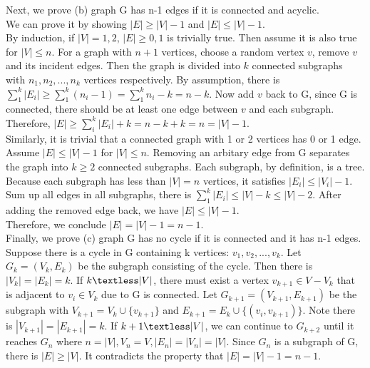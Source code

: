 \documentclass[titlepage, paper=a4, fontsize=11pt]{scrartcl} %
\numberwithin{equation}{section} %
\numberwithin{figure}{section} %
\numberwithin{table}{section} %
\numberwithin{figure}{section}
\begin{document}
Next, we prove (b) graph G has n-1 edges if it is connected and acyclic. \\
We can prove it by showing $|E| \geq |V| -1$ and $|E| \leq |V| -1$. \\
By induction, if $|V|=1,2$, $|E| \geq 0,1$ is trivially true. Then assume it is also true for $|V| \leq n$. For a graph with $n+1$ vertices, choose a random vertex $v$, remove $v$ and its incident edges. Then the graph is divided into $k$ connected subgraphs with $n_1, n_2, ... , n_k$ vertices respectively. By assumption, there is $\sum_1^k |E_i| \geq \sum_1^k (n_i -1)=\sum_1^k n_i - k = n-k$. Now add $v$ back to G, since G is connected, there should be at least one edge between $v$ and each subgraph. Therefore,
$|E| \geq \sum_i^k |E_i| + k = n-k+k = n = |V| - 1$. \\
Similarly, it is trivial that a connected graph with 1 or 2 vertices has 0 or 1 edge. Assume $|E| \leq |V| -1$ for $|V| \leq n$. Removing an arbitary edge from G separates the graph into $k \geq 2$ connected subgraphs. Each subgraph, by definition, is a tree. Because each subgraph has less than $|V|=n$ vertices, it satisfies $|E_i| \leq |V_i| - 1$. Sum up all edges in all subgraphs, there is $\sum_1^k |E_i| \leq |V| - k \leq |V| - 2$. After adding the removed edge back, we have $|E| \leq |V| - 1$. \\
Therefore, we conclude $|E| = |V| - 1 = n-1$. \\

Finally, we prove (c) graph G has no cycle if it is connected and it has n-1 edges. \\
Suppose there is a cycle in G containing k vertices: $v_1, v_2, ... , v_k$. Let $G_k = (V_k, E_k)$ be the subgraph consisting of the cycle. Then there is $|V_k| = |E_k| = k$. If $k \textless |V|$, there must exist a vertex $v_{k+1} \in V - V_k$ that is adjacent to $v_i \in V_k$ due to G is connected. Let $G_{k+1} = (V_{k+1}, E_{k+1})$ be the subgraph with $V_{k+1} = V_k \cup \{v_{k+1}\}$ and $E_{k+1} = E_k \cup \{(v_i, v_{k+1})\}$. Note there is $|V_{k+1}| = |E_{k+1}| = k$. If $k+1 \textless |V|$, we can continue to $G_{k+2}$ until it reaches $G_n$ where $n=|V|, V_n=V, |E_n|=|V_n|=|V|$. Since $G_n$ is a subgraph of G, there is $|E| \geq |V|$. It contradicts the property that $|E|=|V|-1=n-1$. \\




\end{document}
